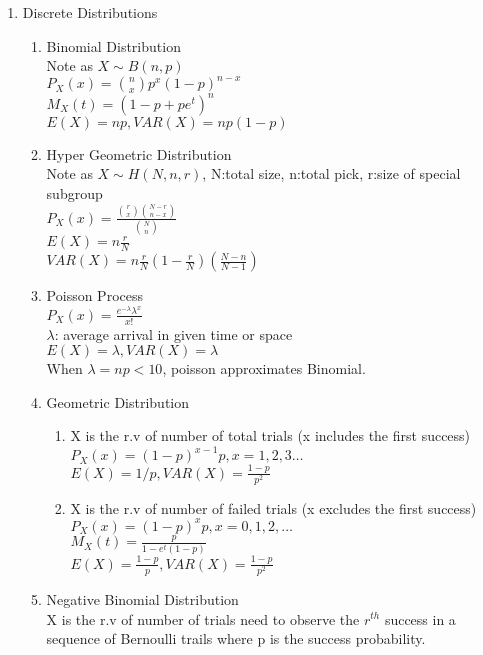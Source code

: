 \documentclass[10pt]{article}
\begin{document}
\begin{multicols}{2}
\begin{enumerate}
			\item Discrete Distributions
			\begin{enumerate}
				\item Binomial Distribution\\
				Note as $X \sim B(n,p)$\\
				$P_X(x) = {n \choose x} p^x (1-p)^{n-x}$\\
				$M_X(t) = (1-p+pe^t)^n$\\
				$E(X) = np, VAR(X) = np(1-p)$
				\item Hyper Geometric Distribution\\
				Note as $X \sim H(N,n,r)$, N:total size, n:total pick, r:size of special subgroup\\
				$P_X(x) = \frac{{r \choose x}{N-r \choose n-x}}{{N \choose n}}$\\
				$E(X) = n\frac{r}{N}$\\
				$VAR(X) = n\frac{r}{N}(1-\frac{r}{N})(\frac{N-n}{N-1})$
				\item Poisson Process\\
				$P_X(x) = \frac{e^{-\lambda}\lambda^x}{x!}$\\
				$\lambda$: average arrival in given time or space\\
				$E(X) = \lambda, VAR(X) = \lambda$\\
				When $\lambda = np < 10$, poisson approximates Binomial.
				\item Geometric Distribution\\
				\begin{enumerate}
					\item X is the r.v of number of total trials (x includes the first success)\\
					$P_X(x) = (1-p)^{x-1}p, x = 1,2,3 \dots$\\
					$E(X) = 1/p, VAR(X) = \frac{1-p}{p^2}$
					\item X is the r.v of number of failed trials (x excludes the first success)\\
					$P_X(x) = (1-p)^xp, x = 0,1,2,\dots$\\
					$M_X(t) = \frac{p}{1-e^t(1-p)}$\\
					$E(X) = \frac{1-p}{p}, VAR(X) = \frac{1-p}{p^2}$
				\end{enumerate}
				\item Negative Binomial Distribution\\
				X is the r.v of number of trials need to observe the $r^{th}$ success in a sequence of Bernoulli trails where p is the success probability.\\

\end{enumerate}
\end{enumerate}
\end{multicols}
\end{document}
